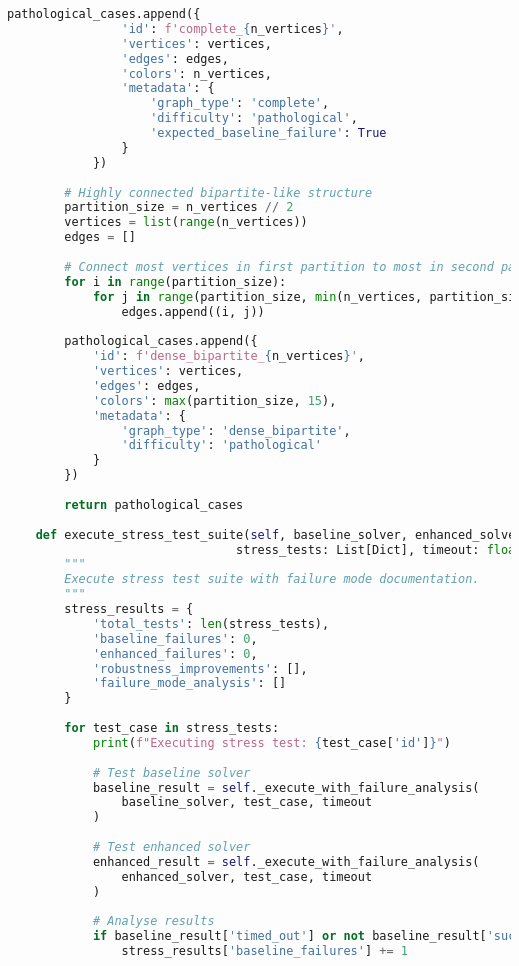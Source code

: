 \begin{lstlisting}[language=Python, caption=Stress Testing Framework for Worst-Case Validation]
            pathological_cases.append({
                'id': f'complete_{n_vertices}',
                'vertices': vertices,
                'edges': edges,
                'colors': n_vertices,
                'metadata': {
                    'graph_type': 'complete',
                    'difficulty': 'pathological',
                    'expected_baseline_failure': True
                }
            })
        
        # Highly connected bipartite-like structure
        partition_size = n_vertices // 2
        vertices = list(range(n_vertices))
        edges = []
        
        # Connect most vertices in first partition to most in second partition
        for i in range(partition_size):
            for j in range(partition_size, min(n_vertices, partition_size + 15)):
                edges.append((i, j))
        
        pathological_cases.append({
            'id': f'dense_bipartite_{n_vertices}',
            'vertices': vertices,
            'edges': edges,
            'colors': max(partition_size, 15),
            'metadata': {
                'graph_type': 'dense_bipartite',
                'difficulty': 'pathological'
            }
        })
        
        return pathological_cases
    
    def execute_stress_test_suite(self, baseline_solver, enhanced_solver, 
                                stress_tests: List[Dict], timeout: float = 15.0) -> Dict:
        """
        Execute stress test suite with failure mode documentation.
        """
        stress_results = {
            'total_tests': len(stress_tests),
            'baseline_failures': 0,
            'enhanced_failures': 0,
            'robustness_improvements': [],
            'failure_mode_analysis': []
        }
        
        for test_case in stress_tests:
            print(f"Executing stress test: {test_case['id']}")
            
            # Test baseline solver
            baseline_result = self._execute_with_failure_analysis(
                baseline_solver, test_case, timeout
            )
            
            # Test enhanced solver
            enhanced_result = self._execute_with_failure_analysis(
                enhanced_solver, test_case, timeout
            )
            
            # Analyse results
            if baseline_result['timed_out'] or not baseline_result['success']:
                stress_results['baseline_failures'] += 1
            

\end{lstlisting}
